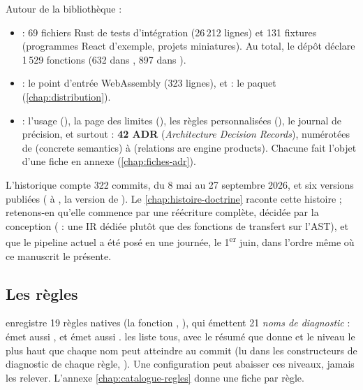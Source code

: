 Autour de la bibliothèque :
\begin{itemize}
  \item {} : 69 fichiers Rust de tests d'intégration
    (26\,212 lignes) et 131 fixtures (programmes React d'exemple, projets
    miniatures). Au total, le dépôt déclare 1\,529 fonctions \code{\#[test]}
    (632 dans , 897 dans ).
  \item {} : le point d'entrée WebAssembly
    (323 lignes), et  : le paquet 
    (\cref{chap:distribution}).
  \item {} : l'usage (), la page des limites
    (), les règles personnalisées
    (), le journal de précision, et surtout
     : \textbf{42 ADR} (\emph{Architecture Decision
    Records}), numérotées de  (\og concrete semantics\fg{}) à
     (\og relations are engine products\fg{}). Chacune fait l'objet
    d'une fiche en annexe (\cref{chap:fiches-adr}).
\end{itemize}

L'historique compte 322 commits, du 8 mai au 27 septembre 2026, et six
versions publiées ( à , la version de
). Le \cref{chap:histoire-doctrine} raconte cette histoire ;
retenons-en qu'elle commence par une réécriture complète, décidée par la
conception ( : une IR dédiée plutôt que des fonctions de transfert sur
l'AST), et que le pipeline actuel a été posé en une journée, le 1\textsuperscript{er}
juin, dans l'ordre même où ce manuscrit le présente.

\subsection{Les règles}

\reactant{} enregistre 19 règles natives (la fonction ,
), qui émettent 21 \emph{noms de diagnostic} :
 émet aussi , et
 émet aussi .
 les liste tous, avec le résumé que donne
 et le niveau le plus haut que chaque nom peut atteindre
au commit \snapshotCommit{} (lu dans les constructeurs de diagnostic de
chaque règle, ). Une configuration peut abaisser ces
niveaux, jamais les relever. L'annexe \ref{chap:catalogue-regles} donne une
fiche par règle.

